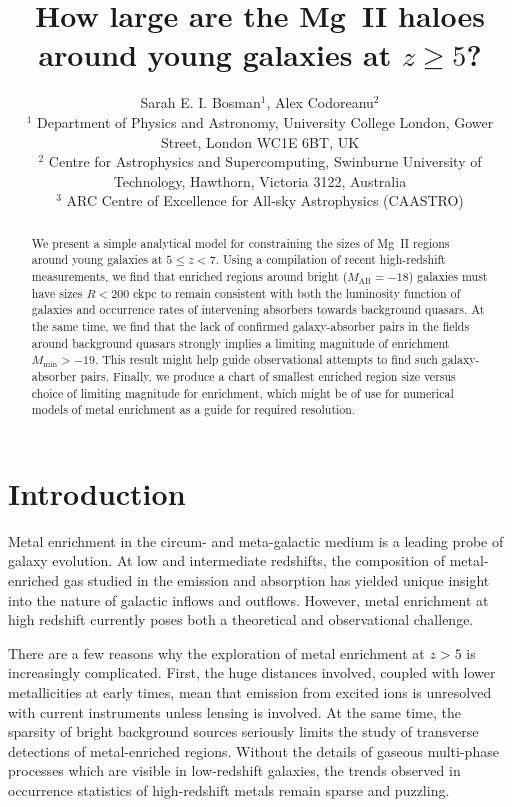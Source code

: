 \documentclass[useAMS,usenatbib]{mn2e}
\author[Bosman \& Codoreanu]
  {Sarah E. I. Bosman$^{1}$, Alex Codoreanu$^{2}$
\\
$^{1}$ Department of Physics and Astronomy, University College London, Gower Street, London WC1E 6BT, UK \\
$^{2}$ Centre for Astrophysics and Supercomputing, Swinburne University of Technology, Hawthorn, Victoria 3122, Australia \\
$^{3}$ ARC Centre of Excellence for All-sky Astrophysics (CAASTRO)
}
\title{How large are the Mg~II haloes around young galaxies at $z\geq 5$?}
\date{}
\newcommand{\magtwo}{Mg~{\small II} }
\begin{document}
\maketitle

\begin{abstract}
We present a simple analytical model for constraining the sizes of \magtwo regions around young galaxies at $5\leq z<7$. Using a compilation of recent high-redshift measurements, we find that enriched regions around bright ($M_\text{AB} = -18$) galaxies must have sizes $R<200$ ckpc to remain consistent with both the luminosity function of galaxies and occurrence rates of intervening absorbers towards background quasars. At the same time, we find that the lack of confirmed galaxy-absorber pairs in the fields around background quasars strongly implies a limiting magnitude of enrichment $M_\text{min}>-19$. This result might help guide observational attempts to find such galaxy-absorber pairs. Finally, we produce a chart of smallest enriched region size versus choice of limiting magnitude for enrichment, which might be of use for numerical models of metal enrichment as a guide for required resolution.
\end{abstract}

\section{Introduction}


Metal enrichment in the circum- and meta-galactic medium is a leading probe of galaxy evolution.
At low and intermediate redshifts, the composition of metal-enriched gas studied in the emission and absorption has yielded unique insight into the nature of galactic inflows and outflows.  
However, metal enrichment at high redshift currently poses both a theoretical and observational challenge. 

There are a few reasons why the exploration of metal enrichment at $z>5$ is increasingly complicated. First, the huge distances involved, coupled with lower metallicities at early times, mean that emission from excited ions is unresolved with current instruments unless lensing is involved. At the same time, the sparsity of bright background sources seriously limits the study of transverse detections of metal-enriched regions. Without the details of gaseous multi-phase processes which are visible in low-redshift galaxies, the trends observed in occurrence statistics of high-redshift metals remain sparse and puzzling.
\end{document}
